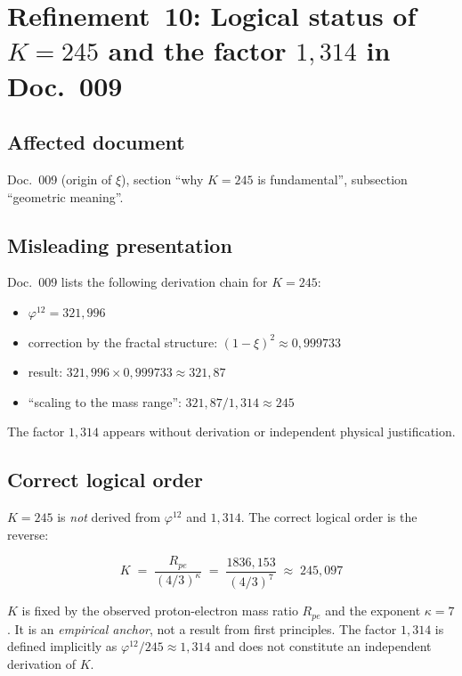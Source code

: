 \section{\texorpdfstring{Refinement~10: Logical status of $K = 245$ and the factor $1{,}314$ in Doc.~009}{Refinement 10: Logical status of K = 245 and the factor 1.314 in Doc. 009}}

\subsection*{Affected document}

Doc.~009 (origin of $\xi$), section \enquote{why $K = 245$ is fundamental},
subsection \enquote{geometric meaning}.

\subsection*{Misleading presentation}

Doc.~009 lists the following derivation chain for $K = 245$:
\begin{itemize}
  \item $\varphi^{12} = 321{,}996$
  \item correction by the fractal structure: $(1-\xi)^2 \approx 0{,}999733$
  \item result: $321{,}996 \times 0{,}999733 \approx 321{,}87$
  \item \enquote{scaling to the mass range}: $321{,}87 / 1{,}314 \approx 245$
\end{itemize}
The factor $1{,}314$ appears without derivation or independent physical
justification.

\subsection*{Correct logical order}

$K = 245$ is \emph{not} derived from $\varphi^{12}$ and $1{,}314$. The correct
logical order is the reverse:

\begin{equation}
  K \;=\; \frac{R_{pe}}{(4/3)^\kappa}
    \;=\; \frac{1836{,}153}{(4/3)^7}
    \;\approx\; 245{,}097
  \tag{190.14}
\end{equation}

$K$ is fixed by the observed proton-electron mass ratio $R_{pe}$ and the
exponent $\kappa = 7$. It is an \emph{empirical anchor}, not a result from
first principles. The factor $1{,}314$ is defined implicitly as
$\varphi^{12} / 245 \approx 1{,}314$ and does not constitute an independent
derivation of $K$.

